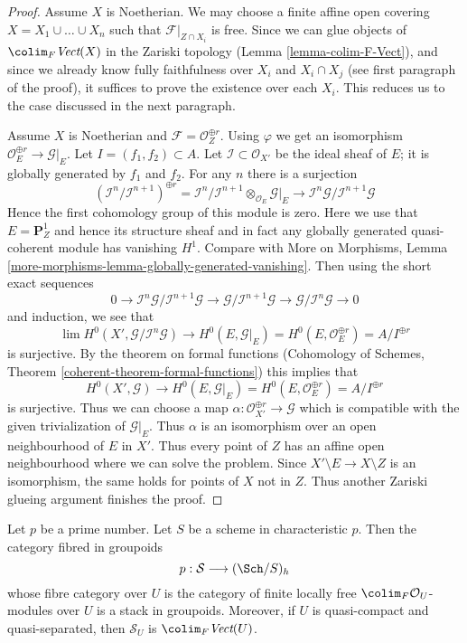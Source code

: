 \begin{proof}
\medskip\noindent
Assume $X$ is Noetherian. We may choose a finite affine open covering
$X = X_1 \cup \ldots \cup X_n$ such that $\mathcal{F}|_{Z \cap X_i}$ is free.
Since we can glue objects of $\colim_F \textit{Vect}(X)$
in the Zariski topology (Lemma \ref{lemma-colim-F-Vect}), and
since we already know
fully faithfulness over $X_i$ and $X_i \cap X_j$ (see first paragraph
of the proof), it suffices to prove the existence over each $X_i$.
This reduces us to the case discussed in the next paragraph.

\medskip\noindent
Assume $X$ is Noetherian and $\mathcal{F} = \mathcal{O}_Z^{\oplus r}$.
Using $\varphi$ we get an isomorphism
$\mathcal{O}_E^{\oplus r} \to \mathcal{G}|_E$.
Let $I = (f_1, f_2) \subset A$.
Let $\mathcal{I} \subset \mathcal{O}_{X'}$
be the ideal sheaf of $E$; it is globally generated by $f_1$ and $f_2$.
For any $n$ there is a surjection
$$
(\mathcal{I}^n/\mathcal{I}^{n + 1})^{\oplus r} =
\mathcal{I}^n/\mathcal{I}^{n + 1} \otimes_{\mathcal{O}_E}
\mathcal{G}|_E \longrightarrow
\mathcal{I}^n\mathcal{G}/\mathcal{I}^{n + 1}\mathcal{G}
$$
Hence the first cohomology group of this module is zero.
Here we use that $E = \mathbf{P}^1_Z$ and hence its structure
sheaf and in fact any globally generated quasi-coherent module
has vanishing $H^1$. Compare with More on Morphisms, Lemma
\ref{more-morphisms-lemma-globally-generated-vanishing}.
Then using the short exact sequences
$$
0 \to  \mathcal{I}^n\mathcal{G}/\mathcal{I}^{n + 1}\mathcal{G} \to
\mathcal{G}/\mathcal{I}^{n + 1}\mathcal{G} \to
\mathcal{G}/\mathcal{I}^n\mathcal{G} \to 0
$$
and induction, we see that
$$
\lim H^0(X', \mathcal{G}/\mathcal{I}^n\mathcal{G})
\to
H^0(E, \mathcal{G}|_E) = H^0(E, \mathcal{O}_E^{\oplus r}) =
A/I^{\oplus r}
$$
is surjective. By the theorem on formal functions
(Cohomology of Schemes, Theorem \ref{coherent-theorem-formal-functions})
this implies that
$$
H^0(X', \mathcal{G}) \to
H^0(E, \mathcal{G}|_E) = H^0(E, \mathcal{O}_E^{\oplus r}) =
A/I^{\oplus r}
$$
is surjective. Thus we can choose a map
$\alpha : \mathcal{O}_{X'}^{\oplus r} \to \mathcal{G}$
which is compatible with the given trivialization
of $\mathcal{G}|_E$. Thus $\alpha$ is an isomorphism over
an open neighbourhood of $E$ in $X'$. Thus every point
of $Z$ has an affine open neighbourhood where
we can solve the problem. Since $X' \setminus E \to X \setminus Z$
is an isomorphism, the same holds for points of $X$ not in $Z$.
Thus another Zariski glueing argument finishes the proof.
\end{proof}

\begin{proposition}
\label{proposition-h-descent-vector-bundles-p}
Let $p$ be a prime number. Let $S$ be a scheme in characteristic $p$.
Then the category fibred in groupoids
$$
p : \mathcal{S} \longrightarrow (\Sch/S)_h
$$
whose fibre category over $U$ is the category
of finite locally free $\colim_F \mathcal{O}_U$-modules over $U$
is a stack in groupoids. Moreover, if $U$ is quasi-compact
and quasi-separated, then $\mathcal{S}_U$ is $\colim_F \textit{Vect}(U)$.
\end{proposition}

